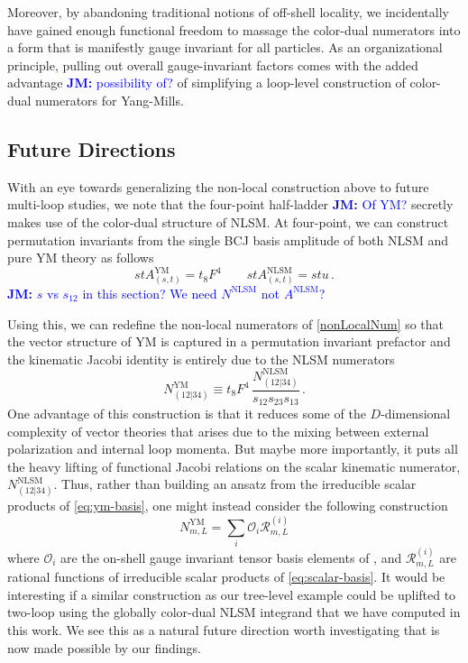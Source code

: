 \documentclass[11pt,letter]{article}
\newcommand{\jm}[1]{\textcolor{blue}{\textbf{JM: }{#1}}}
\def\be{\begin{equation}}
\def\ee{\end{equation}}
\begin{document}
Moreover, by abandoning traditional notions of off-shell
locality, we incidentally have gained enough functional freedom to massage the
color-dual numerators into a form that is manifestly gauge invariant
for all particles. As an organizational principle, pulling out overall
gauge-invariant factors comes with the added advantage \jm{possibility of?} of simplifying
a loop-level construction of color-dual numerators for Yang-Mills.

\subsection{Future Directions}\label{sec:Discussion}
With an eye towards generalizing the non-local construction above to future multi-loop studies, we note that the four-point half-ladder \jm{Of YM?} secretly makes use of the color-dual structure of NLSM. At four-point, we can construct permutation invariants from the single BCJ basis amplitude of both NLSM and pure YM theory as follows
\be
s t A^{\text{YM}}_{(s,t)} = t_8F^4 \qquad s t A^{\text{NLSM}}_{(s,t)} = s t u\, .
\ee
\jm{$s$ vs $s_{12}$ in this section?  We need $N^{\text{NLSM}}$ not $A^{\text{NLSM}}$?}

Using this, we can redefine the non-local numerators of \cref{nonLocalNum} so that the vector structure of YM is captured in a permutation invariant prefactor and the kinematic Jacobi identity is entirely due to the NLSM numerators
\be
N_{(12|34)}^{\text{YM}} \equiv t_8F^4 \,\frac{N_{(12|34)}^{\text{NLSM}}}{s_{12}s_{23}s_{13}} \, .
\ee
One advantage of this construction is that it reduces some of the $D$-dimensional complexity of vector theories that arises due to the mixing between external polarization and
internal loop momenta. But maybe more importantly, it puts all the heavy lifting of functional Jacobi relations on the scalar kinematic numerator, $N_{(12|34)}^{\text{NLSM}}$. Thus, rather
than building an ansatz from the irreducible scalar products of
\cref{eq:ym-basis}, one might instead consider the following construction
\begin{equation}
N^{\text{YM}}_{m,L} = \sum_i \mathcal{O}_i \mathcal{R}^{(i)}_{m,L}
\end{equation}
where $\mathcal{O}_i$ are the on-shell gauge invariant tensor basis elements of
\cite{Bern:2017tuc,Carrasco:2019yyn}, and $ \mathcal{R}^{(i)}_{m,L}$ are
rational functions of irreducible scalar products of \cref{eq:scalar-basis}. It would be interesting if a similar construction as our tree-level example could be uplifted to two-loop using the globally color-dual NLSM integrand that we have computed in this work. We see this as a natural future direction worth investigating that is now made possible by our findings.
\end{document}
